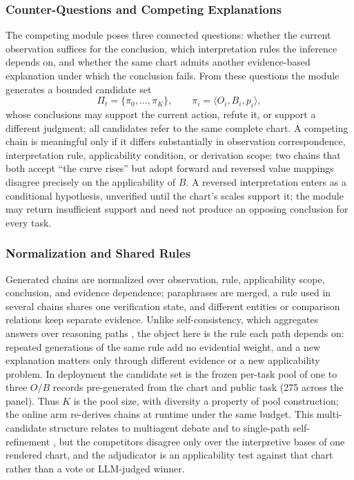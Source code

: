 \subsubsection{Counter-Questions and Competing
Explanations}
The competing module poses three connected questions:
whether the current observation suffices for the
conclusion, which interpretation rules the inference
depends on, and whether the same chart admits another
evidence-based explanation under which the conclusion
fails.
From these questions the module generates a bounded
candidate set
\begin{equation}\label{eq:pis}
\Pi_t = \{\pi_0, \ldots, \pi_K\},
\qquad
\pi_i = \langle O_i, B_i, p_i\rangle,
\end{equation}
whose conclusions may support the
current action, refute it, or support a different
judgment; all candidates refer to the same complete
chart.
A competing chain is meaningful only if it differs
substantially in observation correspondence,
interpretation rule, applicability condition, or
derivation scope: two chains that both accept ``the
curve rises'' but adopt forward and reversed value
mappings disagree precisely on the applicability of
$B$.
A reversed interpretation enters as a conditional
hypothesis, unverified until the chart's scales support
it; the module may return insufficient support and need
not produce an opposing conclusion for every task.

\subsubsection{Normalization and Shared Rules}
Generated chains are normalized over observation, rule,
applicability scope, conclusion, and evidence
dependence; paraphrases are merged, a rule used in
several chains shares one verification state, and
different entities or comparison relations keep
separate evidence.
Unlike self-consistency, which aggregates answers over
reasoning paths \citep{wang2022selfconsistency}, the
object here is the rule each path depends on: repeated
generations of the same rule add no evidential weight,
and a new explanation matters only through different
evidence or a new applicability problem.
In deployment the candidate set is the frozen per-task pool of one to three $O/B$ records pre-generated from the chart and public task (275 across the panel). Thus $K$ is the pool size, with diversity a property of pool construction; the online arm re-derives chains at runtime under the same budget.
This multi-candidate structure relates to multiagent
debate \citep{du2023improving, liang2024encouraging}
and to single-path self-refinement
\citep{madaan2023selfrefine}, but the competitors
disagree only over the interpretive bases of one
rendered chart, and the adjudicator is an applicability test against that chart rather than a vote or LLM-judged winner.

